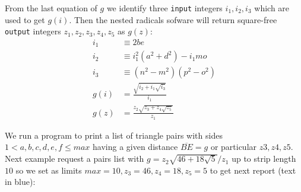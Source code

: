 \documentclass[11pt]{article}
\begin{document}
From the last equation of $g$ we identify three \texttt{input} integers $i_1,i_2,i_3$ which are used to get $g(i)$. Then the nested radicals sofware will return square-free \texttt{output} integers $z_1,z_2,z_3,z_4,z_5$ as $g(z)$:
\begin{align}
i_1 &\equiv 2be\\
i_2 &\equiv i_1^2(a^2+d^2) - i_1mo\\
i_3 &\equiv (n^2-m^2)(p^2-o^2)\\
g(i) &= \frac{\sqrt{i_2 + i_1\sqrt{i_3}}}{i_1}\\
g(z) &= \frac{z_2\sqrt{z_3 + z_4\sqrt{z_5}}}{z_1}
\end{align}

We run a program to print a list of triangle pairs with sides $1 < a,b,c,d,e,f \leq max$ having a given distance $\overline{BE}=g$ or particular $z3,z4,z5$. Next example request a pairs list with $g = z_2\sqrt{46+18\sqrt{5}}/z_1$ up to strip length $10$ so we set as limits $max=10, z_3=46, z_4=18, z_5=5$ to get next report (text in blue):
\end{document}
